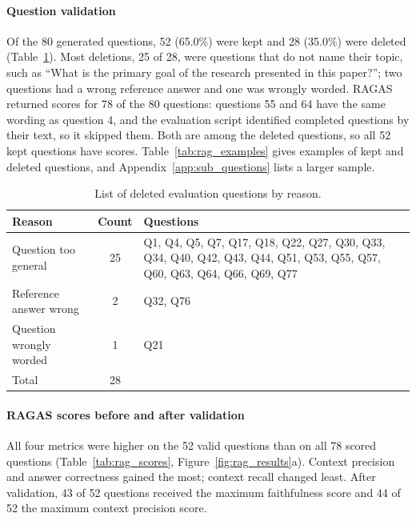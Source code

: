\documentclass[bdcc,article,submit,pdftex,moreauthors]{Definitions/mdpi}
\begin{document}
\paragraph{Question validation}
Of the 80 generated questions, 52 (65.0\%) were kept and 28 (35.0\%) were deleted (Table~\ref{tab:rag_deleted}). Most deletions, 25 of 28, were questions that do not name their topic, such as ``What is the primary goal of the research presented in this paper?''; two questions had a wrong reference answer and one was wrongly worded. RAGAS returned scores for 78 of the 80 questions: questions 55 and 64 have the same wording as question 4, and the evaluation script identified completed questions by their text, so it skipped them. Both are among the deleted questions, so all 52 kept questions have scores. Table~\ref{tab:rag_examples} gives examples of kept and deleted questions, and Appendix~\ref{app:sub_questions} lists a larger sample.

\begin{table}[H]
\centering
\caption{List of deleted evaluation questions by reason.}
\label{tab:rag_deleted}
\footnotesize
\begin{tabularx}{\textwidth}{p{} c X}
\toprule
\textbf{Reason} & \textbf{Count} & \textbf{Questions} \\
\midrule
Question too general & 25 & Q1, Q4, Q5, Q7, Q17, Q18, Q22, Q27, Q30, Q33, Q34, Q40, Q42, Q43, Q44, Q51, Q53, Q55, Q57, Q60, Q63, Q64, Q66, Q69, Q77 \\
\midrule
Reference answer wrong & 2 & Q32, Q76 \\
\midrule
Question wrongly worded & 1 & Q21 \\
\midrule
Total & 28 & \\
\bottomrule
\end{tabularx}
\end{table}


\paragraph{RAGAS scores before and after validation}
All four metrics were higher on the 52 valid questions than on all 78 scored questions (Table~\ref{tab:rag_scores}, Figure~\ref{fig:rag_results}a). Context precision and answer correctness gained the most; context recall changed least. After validation, 43 of 52 questions received the maximum faithfulness score and 44 of 52 the maximum context precision score.
\end{document}
